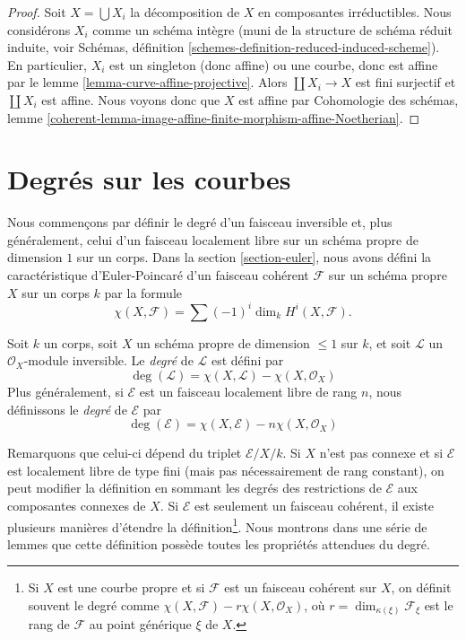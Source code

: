 \begin{proof}
Soit $X = \bigcup X_i$ la décomposition de $X$ en composantes irréductibles.
Nous considérons $X_i$ comme un schéma intègre (muni de la structure
de schéma réduit induite, voir Schémas, définition
\ref{schemes-definition-reduced-induced-scheme}).
En particulier, $X_i$ est un singleton (donc affine) ou une courbe,
donc est affine par le lemme \ref{lemma-curve-affine-projective}.
Alors $\coprod X_i \to X$ est fini surjectif et $\coprod X_i$ est affine.
Nous voyons donc que $X$ est affine par
Cohomologie des schémas, lemme
\ref{coherent-lemma-image-affine-finite-morphism-affine-Noetherian}.
\end{proof}






\section{Degrés sur les courbes}
\label{section-divisors-curves}

\noindent
Nous commençons par définir le degré d'un faisceau inversible et, plus généralement,
celui d'un faisceau localement libre sur un schéma propre
de dimension $1$ sur un corps. Dans la section \ref{section-euler},
nous avons défini la caractéristique d'Euler-Poincaré
d'un faisceau cohérent $\mathcal{F}$ sur un schéma propre $X$ sur un corps
$k$ par la formule
$$
\chi(X, \mathcal{F}) = \sum (-1)^i \dim_k H^i(X, \mathcal{F}).
$$

\begin{definition}
\label{definition-degree-invertible-sheaf}
Soit $k$ un corps, soit $X$ un schéma propre de dimension $\leq 1$
sur $k$, et soit $\mathcal{L}$ un $\mathcal{O}_X$-module inversible.
Le {\it degré} de $\mathcal{L}$ est défini par
$$
\deg(\mathcal{L}) = \chi(X, \mathcal{L}) - \chi(X, \mathcal{O}_X)
$$
Plus généralement, si $\mathcal{E}$ est un faisceau localement libre de rang $n$,
nous définissons le {\it degré} de $\mathcal{E}$ par
$$
\deg(\mathcal{E}) = \chi(X, \mathcal{E}) - n\chi(X, \mathcal{O}_X)
$$
\end{definition}

\noindent
Remarquons que celui-ci dépend du triplet $\mathcal{E}/X/k$.
Si $X$ n'est pas connexe et si $\mathcal{E}$ est localement libre de type fini (mais
pas nécessairement de rang constant), on peut modifier la définition en sommant les degrés
des restrictions de $\mathcal{E}$ aux composantes connexes de $X$.
Si $\mathcal{E}$ est seulement un faisceau cohérent, il existe plusieurs
manières d'étendre la définition\footnote{Si $X$ est une courbe propre
et si $\mathcal{F}$ est un faisceau cohérent sur $X$, on définit souvent
le degré comme $\chi(X, \mathcal{F}) - r\chi(X, \mathcal{O}_X)$,
où $r = \dim_{\kappa(\xi)} \mathcal{F}_\xi$ est le rang de $\mathcal{F}$
au point générique $\xi$ de $X$.}.
Nous montrons dans une série de lemmes que cette définition possède toutes les propriétés
attendues du degré.

